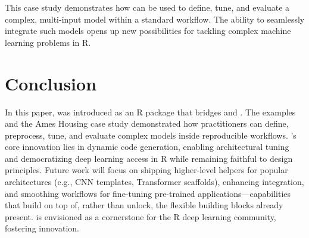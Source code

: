 This case study demonstrates how  can be used to define, tune, and evaluate a complex, multi-input  model within a standard  workflow. The ability to seamlessly integrate such models opens up new possibilities for tackling complex machine learning problems in R.

\section{Conclusion}\label{sec:conclusion}

In this paper,  was introduced as an R package that bridges  and . The examples and the Ames Housing case study demonstrated how practitioners can define, preprocess, tune, and evaluate complex  models inside reproducible  workflows. 's core innovation lies in dynamic code generation, enabling architectural tuning and democratizing deep learning access in R while remaining faithful to  design principles. Future work will focus on shipping higher-level helpers for popular architectures (e.g., CNN templates, Transformer scaffolds), enhancing  integration, and smoothing workflows for fine-tuning pre-trained  applications---capabilities that build on top of, rather than unlock, the flexible building blocks already present.  is envisioned as a cornerstone for the R deep learning community, fostering innovation.



\address{%
David Díaz\\
Independent Researcher\\%
\\
%
%
\textit{ORCiD: \href{https://orcid.org/0000-0002-0927-9795}{0000-0002-0927-9795}}\\%
\href{mailto:daviddrsch@gmail.com}{\nolinkurl{daviddrsch@gmail.com}}%
}
